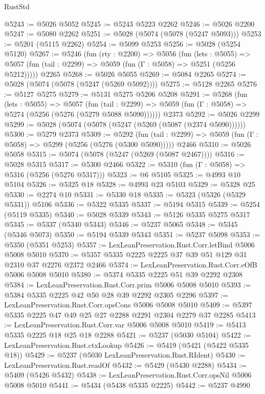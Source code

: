 \begin{lexlean}{RustStd}
\begin{coremodule}
{\begin{coremodule}
{{{{{{{{{{{{@5243 := @5026 @5052
@5245 := @5243 @5223 @2262
@5246 := @5026 @2200
@5247 := @5080 @2262
@5251 := @5028 (@5074 (@5078 (@5247 @5093)))
@5253 := @5201 (@5115 @2262)
@5254 := @5099 @5253
@5256 := @5028 (@5254 @5120)
@5267 := @5246
    (fun (rty : @2200) =>
    @5056
      (fun (lets : @5055) =>
      @5057 (fun (tail : @2299) => @5059 (fun (Γ : @5058) => @5251 (@5256 @5212)))))
    @2265
@5268 := @5026 @5055
@5269 := @5084 @2265
@5274 := @5028 (@5074 (@5078 (@5247 (@5269 @5092))))
@5275 := @5128 @2265
@5276 := @5127 @5275
@5279 := @5131 @5275 @5206 @5208
@5291 := @5268
    (fun (lets : @5055) =>
    @5057
      (fun (tail : @2299) => @5059 (fun (Γ : @5058) => @5274 (@5256 (@5276 (@5279 @5088 @5090))))))
    @2373
@5292 := @5026 @2299
@5299 := @5028 (@5074 (@5078 (@5247 (@5269 (@5087 (@2374 @5090))))))
@5300 := @5279 @2373
@5309 := @5292
    (fun (tail : @2299) => @5059 (fun (Γ : @5058) => @5299 (@5256 (@5276 (@5300 @5090)))))
    @2466
@5310 := @5026 @5058
@5315 := @5074 (@5078 (@5247 (@5269 (@5087 @2467))))
@5316 := @5028 @5315
@5317 := @5300 @2466
@5322 := @5310 (fun (Γ : @5058) => @5316 (@5256 (@5276 @5317)))
@5323 := @6 @5105
@5325 := @4993 @10 @5104
@5326 := @5325 @18
@5328 := @4993 @23 @5103
@5329 := @5328 @25
@5330 := @2274 @10
@5331 := @5330 @18
@5335 := @5323 (@5326 (@5329 @5331)) @5106
@5336 := @5322 @5335
@5337 := @5194 @5315
@5339 := @5254 (@5119 @5335)
@5340 := @5028 @5339
@5343 := @5126 @5335 @5275 @5317
@5345 := @5337 (@5340 @5343)
@5346 := @5237 @5065
@5348 := @5345 (@5346 @5073)
@5350 := @5194 @5339 @5343
@5351 := @5237 @5098
@5353 := @5350 (@5351 @5253)
@5357 := LexLeanPreservation.Rust.Corr.letBind @5006 @5008 @5010
@5370 := @5357 @5335 @2225 @2225 @37 @39 @51 @129 @31 @2310 @37 @2276 @2372 @2466
@5374 := LexLeanPreservation.Rust.Corr.eOfB @5006 @5008 @5010
@5380 := @5374 @5335 @2225 @51 @39 @2292 @2308
@5384 := LexLeanPreservation.Rust.Corr.prim @5006 @5008 @5010
@5393 := @5384 @5335 @2225 @42 @50 @28 @39 @2292 @2305 @2296
@5397 := LexLeanPreservation.Rust.Corr.opsCons @5006 @5008 @5010
@5409 := @5397 @5335 @2225 @47 @49 @25 @27 @2288 @2291 @2304 @2279 @37 @2285
@5413 := LexLeanPreservation.Rust.Corr.var @5006 @5008 @5010
@5419 := @5413 @5335 @2225 @18 @25 @18 @2288
@5421 := @5237 (@5030 @5104)
@5422 := LexLeanPreservation.Rust.ctxLookup
@5426 := @5419 (@5421 (@5422 @5335 @18))
@5429 := @5237 (@5030 LexLeanPreservation.Rust.RIdent)
@5430 := LexLeanPreservation.Rust.readOf
@5432 := @5429 (@5430 @2288)
@5434 := @5409 (@5426 @5432)
@5438 := LexLeanPreservation.Rust.Corr.opsNil @5006 @5008 @5010
@5441 := @5434 (@5438 @5335 @2225)
@5442 := @5237 @4990
}}}}}}}}}}}}
\end{coremodule}}
\end{coremodule}
\end{lexlean}
